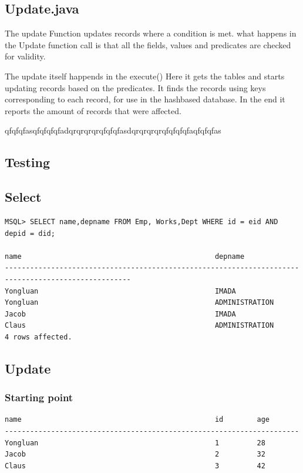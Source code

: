 \documentclass[a4paper,10pt,titlepage]{report}
\begin{document}
{\subsection{Update.java}
The update Function updates records where a condition is met. what happens in the Update function call is that all the fields, values and predicates are checked for validity.

The update itself happends in the \textsf{execute()}  Here it gets the tables and starts updating records based on the predicates. It finds the records using keys corresponding to each record, for use in the hashbased database. In the end it reports the amount of records that were affected.


qfqfqfasqfqfqfqfadqrqrqrqrqfqfqfasdqrqrqrqrqfqfqfqfaqfqfqfas
\subsection{Testing}

\subsection{Select}
\begin{lstlisting}
MSQL> SELECT name,depname FROM Emp, Works,Dept WHERE id = eid AND depid = did;

name                                              depname                                           
----------------------------------------------------------------------------------------------------
Yongluan                                          IMADA                                             
Yongluan                                          ADMINISTRATION                                    
Jacob                                             IMADA                                             
Claus                                             ADMINISTRATION                                    
4 rows affected.
\end{lstlisting}

\subsection{Update}
\subsubsection{Starting point}
\begin{lstlisting}
name                                              id        age       
----------------------------------------------------------------------
Yongluan                                          1         28        
Jacob                                             2         32        
Claus                                             3         42       
\end{lstlisting}
}
\end{document}
